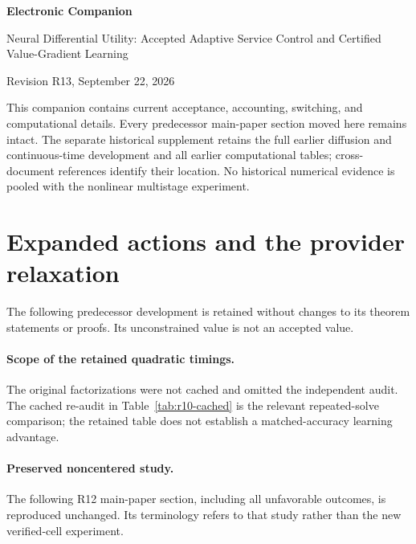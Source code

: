 \documentclass[11pt,letterpaper]{article}
\theoremstyle{definition}
\newcommand{\1}{\mathbf 1}
\begin{document}
\begin{center}{\Large\bfseries Electronic Companion\par}\medskip
{\large Neural Differential Utility: Accepted Adaptive Service Control and Certified Value-Gradient Learning\par}\medskip
Revision R13, September 22, 2026
\end{center}
This companion contains current acceptance, accounting, switching, and computational details. Every predecessor main-paper section moved here remains intact. The separate historical supplement retains the full earlier diffusion and continuous-time development and all earlier computational tables; cross-document references identify their location. No historical numerical evidence is pooled with the nonlinear multistage experiment.









\section{Expanded actions and the provider relaxation}\label{ec:r12-provider}
The following predecessor development is retained without changes to its theorem statements or proofs. Its unconstrained value is not an accepted value.




\paragraph{Scope of the retained quadratic timings.}
The original factorizations were not cached and omitted the independent audit. The cached re-audit in Table~\ref{tab:r10-cached} is the relevant repeated-solve comparison; the retained table does not establish a matched-accuracy learning advantage.

\paragraph{Preserved noncentered study.} The following R12 main-paper section, including all unfavorable outcomes, is reproduced unchanged. Its terminology refers to that study rather than the new verified-cell experiment.





\clearpage
\end{document}
